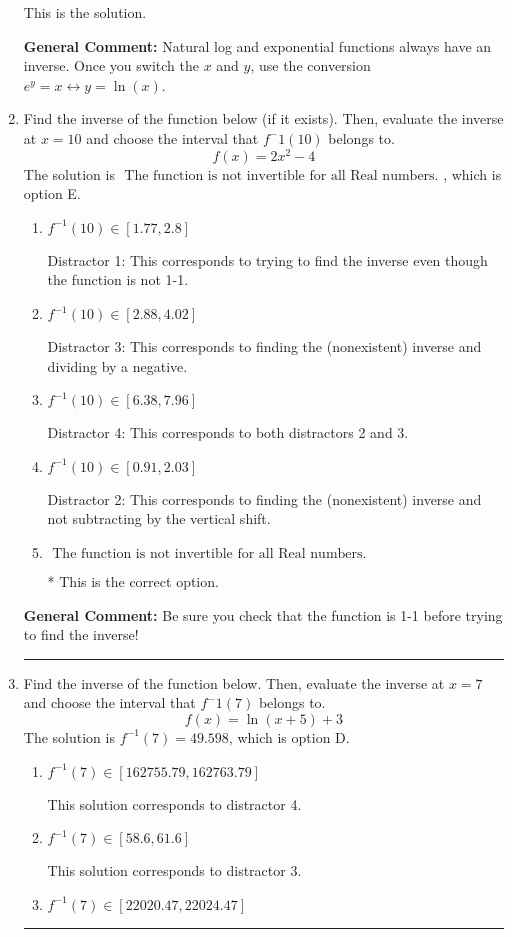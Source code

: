 \documentclass{extbook}[14pt]
\newcommand{\litem}[1]{\item #1

\rule{\textwidth}{0.4pt}}
\begin{document}
\begin{enumerate}
{\begin{enumerate}[label=\Alph*.]
 This is the solution.
\end{enumerate}

\textbf{General Comment:} Natural log and exponential functions always have an inverse. Once you switch the $x$ and $y$, use the conversion $ e^y = x \leftrightarrow y=\ln(x)$.
}
\litem{
Find the inverse of the function below (if it exists). Then, evaluate the inverse at $x = 10$ and choose the interval that $f^-1(10)$ belongs to.
\[ f(x) = 2 x^2 - 4 \]The solution is \( \text{ The function is not invertible for all Real numbers. } \), which is option E.\begin{enumerate}[label=\Alph*.]
\item \( f^{-1}(10) \in [1.77, 2.8] \)

 Distractor 1: This corresponds to trying to find the inverse even though the function is not 1-1. 
\item \( f^{-1}(10) \in [2.88, 4.02] \)

 Distractor 3: This corresponds to finding the (nonexistent) inverse and dividing by a negative.
\item \( f^{-1}(10) \in [6.38, 7.96] \)

 Distractor 4: This corresponds to both distractors 2 and 3.
\item \( f^{-1}(10) \in [0.91, 2.03] \)

 Distractor 2: This corresponds to finding the (nonexistent) inverse and not subtracting by the vertical shift.
\item \( \text{ The function is not invertible for all Real numbers. } \)

* This is the correct option.
\end{enumerate}

\textbf{General Comment:} Be sure you check that the function is 1-1 before trying to find the inverse!
}
\litem{
Find the inverse of the function below. Then, evaluate the inverse at $x = 7$ and choose the interval that $f^-1(7)$ belongs to.
\[ f(x) = \ln{(x+5)}+3 \]The solution is \( f^{-1}(7) = 49.598 \), which is option D.\begin{enumerate}[label=\Alph*.]
\item \( f^{-1}(7) \in [162755.79, 162763.79] \)

 This solution corresponds to distractor 4.
\item \( f^{-1}(7) \in [58.6, 61.6] \)

 This solution corresponds to distractor 3.
\item \( f^{-1}(7) \in [22020.47, 22024.47] \)


\end{enumerate}}
\end{enumerate}
\end{document}
